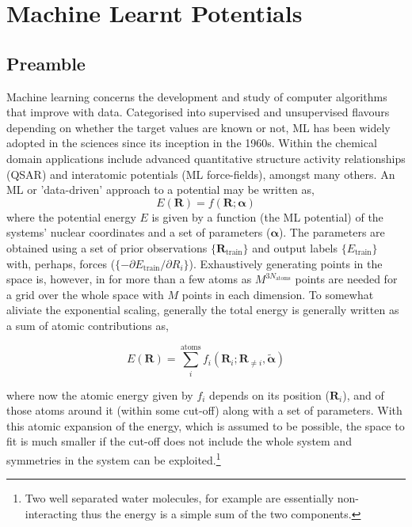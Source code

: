 \documentclass[main.tex]{subfiles}
\begin{document}
\section{Machine Learnt Potentials}
\subsection{Preamble}

Machine learning concerns the development and study of computer algorithms that improve with data.\cite{Mitchell1997} Categorised into supervised and unsupervised flavours depending on whether the target values are known or not, ML has been widely adopted in the sciences since its inception in  the 1960s.\cite{Carleo2019} Within the chemical domain applications include advanced quantitative structure activity relationships (QSAR) and interatomic potentials (ML force-fields), amongst many others.\cite{Cova2019} An ML or 'data-driven' approach to a potential may be written as,
\begin{equation}
	E(\boldsymbol{R}) = f(\boldsymbol{R}; \boldsymbol{\alpha})
\end{equation}
where the potential energy $E$ is given by a function (the ML potential) of the systems' nuclear coordinates and a set of parameters ($\boldsymbol{\alpha}$). The parameters are obtained using a set of prior observations $\{\boldsymbol{R}_\text{train}\}$ and output labels $\{E_\text{train}\}$ with, perhaps, forces ($\{-\partial E_\text{train}/\partial R_i\}$). Exhaustively generating points in the space is, however, in for more than a few atoms as $M^{3N_\text{atoms}}$ points are needed for a grid over the whole space with $M$ points in each dimension. To somewhat aliviate the exponential scaling, generally the total energy is generally written as a sum of atomic contributions as,

\begin{equation}
	E(\boldsymbol{R}) = \sum_i^\text{atoms} f_i (\boldsymbol{R}_i; \boldsymbol{R}_{\ne i}, \tilde{\boldsymbol{\alpha}})
\end{equation}

where now the atomic energy given by $f_i$ depends on its position ($\boldsymbol{R}_i$), and of those atoms around it (within some cut-off) along with a set of parameters. With this atomic expansion of the energy, which is assumed to be possible, the space to fit is much smaller if the cut-off does not include the whole system and symmetries in the system can be exploited.\footnote{Two well separated water molecules, for example are essentially non-interacting thus the energy is a simple sum of the two components.}
\end{document}
